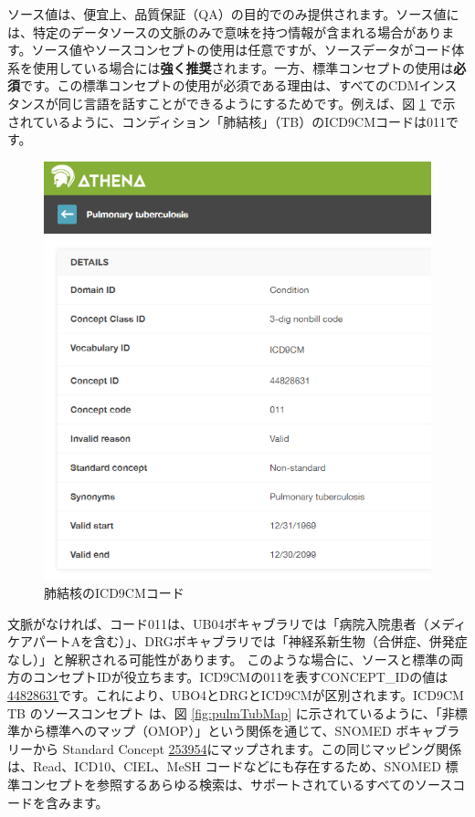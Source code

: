 \documentclass[
  11pt]{book}
\theoremstyle{definition}
\theoremstyle{definition}
\theoremstyle{definition}
\theoremstyle{definition}
\theoremstyle{remark}
\begin{document}
ソース値は、便宜上、品質保証（QA）の目的でのみ提供されます。ソース値には、特定のデータソースの文脈のみで意味を持つ情報が含まれる場合があります。ソース値やソースコンセプトの使用は任意ですが、ソースデータがコード体系を使用している場合には\textbf{強く推奨}されます。一方、標準コンセプトの使用は\textbf{必須}です。この標準コンセプトの使用が必須である理由は、すべてのCDMインスタンスが同じ言語を話すことができるようにするためです。例えば、図 \ref{fig:pulmTubICD9} で示されているように、コンディション「肺結核」（TB）のICD9CMコードは011です。

\begin{figure}

{\centering \includegraphics[width=0.75\linewidth]{images/CommonDataModel/pulmTubICD9} 

}

\caption{肺結核のICD9CMコード}\label{fig:pulmTubICD9}
\end{figure}

文脈がなければ、コード011は、UB04ボキャブラリでは「病院入院患者（メディケアパートAを含む）」、DRGボキャブラリでは「神経系新生物（合併症、併発症なし）」と解釈される可能性があります。 このような場合に、ソースと標準の両方のコンセプトIDが役立ちます。ICD9CMの011を表すCONCEPT\_IDの値は\href{http://athena.ohdsi.org/search-terms/terms/44828631}{44828631}です。これにより、UBO4とDRGとICD9CMが区別されます。ICD9CM TB のソースコンセプト は、図 \ref{fig:pulmTubMap} に示されているように、「非標準から標準へのマップ（OMOP）」という関係を通じて、SNOMED ボキャブラリーから Standard Concept \href{http://athena.ohdsi.org/search-terms/terms/253954}{253954}にマップされます。この同じマッピング関係は、Read、ICD10、CIEL、MeSH コードなどにも存在するため、SNOMED 標準コンセプトを参照するあらゆる検索は、サポートされているすべてのソースコードを含みます。
\end{document}
